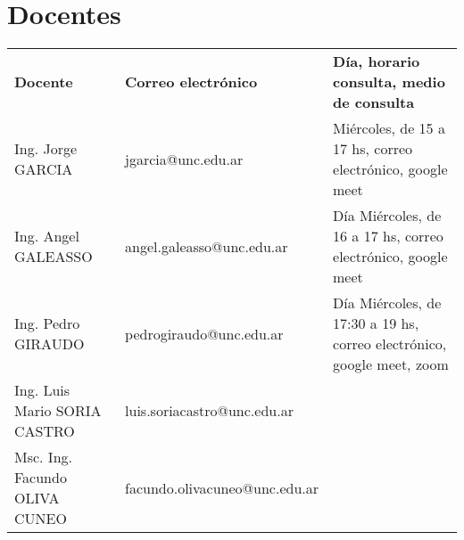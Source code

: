 \section*{Docentes}
\label{00.docentes}

{\small
  \begin{tabular}{llm{}} \rowcolor{yellow!30}
 {\bf Docente} & {\bf Correo electr\'onico} & {\bf D\'ia, horario consulta, medio de consulta} \\ \rowcolor{cyan!20}
  Ing. Jorge GARCIA & jgarcia@unc.edu.ar & {  Mi\'ercoles, de 15 a 17 hs, correo electr\'onico, google meet }\\ 
  Ing. Angel  GALEASSO & angel.galeasso@unc.edu.ar & D\'ia Mi\'ercoles, de 16 a 17 hs, correo electr\'onico, google meet    \\ \rowcolor{cyan!20} 
    Ing. Pedro GIRAUDO  & pedrogiraudo@unc.edu.ar &  D\'ia Mi\'ercoles, de 17:30 a 19 hs, correo electr\'onico, google meet, zoom     \\

    Ing. Luis Mario SORIA CASTRO & luis.soriacastro@unc.edu.ar &
    \\ \rowcolor{cyan!20}
    Msc. Ing. Facundo OLIVA CUNEO & facundo.olivacuneo@unc.edu.ar & \\ \hline
  \end{tabular}
  }